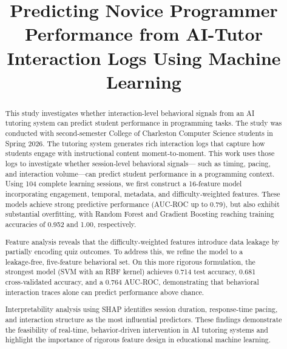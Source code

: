 \documentclass[conference]{IEEEtran}
\begin{document}
\renewcommand{\thesection}{\arabic{section}}
\renewcommand{\thesubsection}{\arabic{section}.\arabic{subsection}}
\renewcommand{\thetable}{\arabic{section}.\arabic{table}}
\renewcommand{\thefigure}{\arabic{section}.\arabic{figure}}


\title{Predicting Novice Programmer Performance from AI-Tutor Interaction Logs Using Machine Learning}

\author{
}

\maketitle

\begin{abstract}
This study investigates whether interaction-level behavioral signals from an AI tutoring system can predict student performance in programming tasks. The study was conducted with
second‑semester College of Charleston Computer Science students in Spring
2026. The tutoring system generates rich interaction logs that capture how
students engage with instructional content moment‑to‑moment. This work
uses those logs to investigate whether session‑level behavioral signals—
such as timing, pacing, and interaction volume—can predict student
performance in a programming context. Using 104 complete learning
sessions, we first construct a 16‑feature model incorporating engagement,
temporal, metadata, and difficulty‑weighted features. These models achieve
strong predictive performance (AUC‑ROC up to 0.79), but also exhibit
substantial overfitting, with Random Forest and Gradient Boosting reaching
training accuracies of 0.952 and 1.00, respectively.

Feature analysis reveals that the difficulty‑weighted features introduce
data leakage by partially encoding quiz outcomes. To address this, we
refine the model to a leakage‑free, five‑feature behavioral set. On this
more rigorous formulation, the strongest model (SVM with an RBF kernel)
achieves 0.714 test accuracy, 0.681 cross‑validated accuracy, and a
0.764 AUC‑ROC, demonstrating that behavioral interaction traces alone can
predict performance above chance.


Interpretability analysis using SHAP identifies session duration, response-time pacing, and interaction structure as the most influential predictors. These findings demonstrate the feasibility of real-time, behavior-driven intervention in AI tutoring systems and highlight the importance of rigorous feature design in educational machine learning.

\end{abstract}
\end{document}
